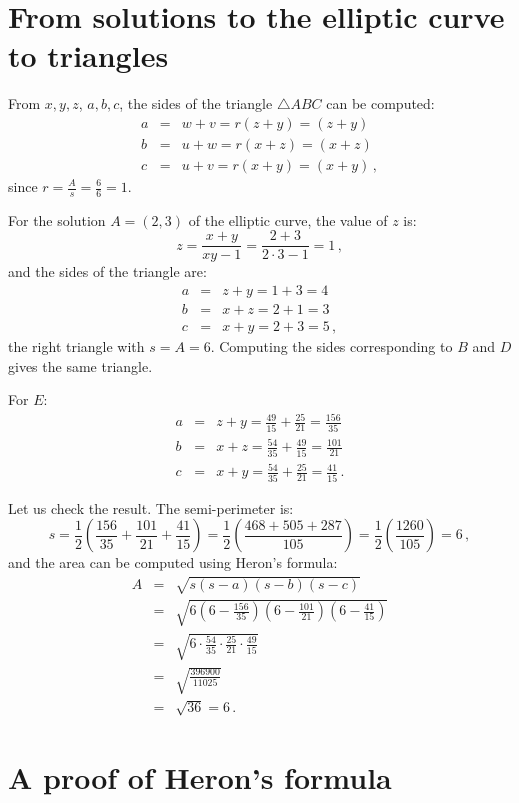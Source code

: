 \section{From solutions to the elliptic curve to triangles}

From $x,y,z$, $a,b,c$, the sides of the triangle $\triangle ABC$ can be computed:
\begin{eqnarray*}
a&=&w+v = r(z+y)=(z+y)\\
b&=&u+w= r(x+z)=(x+z)\\
c&=&u+v=r(x+y)=(x+y)\,,
\end{eqnarray*}
since $\displaystyle r=\frac{A}{s}=\frac{6}{6}=1$.

For the solution $A=(2,3)$ of the elliptic curve, the value of $z$ is:
\[
z=\frac{x+y}{xy-1}=\frac{2+3}{2\cdot 3-1}=1\,,
\]
and the sides of the triangle are:
\begin{eqnarray*}
a &=& z+y = 1+3 = 4\\
b &=& x+z = 2+1=3\\
c &=& x+y = 2+3=5\,,
\end{eqnarray*}
the right triangle with $s=A=6$. Computing the sides corresponding to $B$ and $D$ gives the same triangle.

For $E$:
\begin{eqnarray*}
a &=& z+y = \frac{49}{15} + \frac{25}{21} = \frac{156}{35}\\
b &=& x+z = \frac{54}{35} + \frac{49}{15} = \frac{101}{21}\\
c &=& x+y = \frac{54}{35} + \frac{25}{21}  = \frac{41}{15}\,.
\end{eqnarray*}

Let us check the result. The semi-perimeter is:
\[
s=\frac{1}{2}\left(\frac{156}{35} + \frac{101}{21}+\frac{41}{15}\right) = \frac{1}{2}\left(\frac{468+505+287}{105}\right) = \frac{1}{2}\left(\frac{1260}{105}\right)= 6\,,
\]
and the area can be computed using Heron's formula:
\begin{eqnarray*}
A &=& \sqrt{s(s-a)(s-b)(s-c)}\\
&=& \sqrt{6 \left(6-\frac{156}{35}\right) \left(6-\frac{101}{21}\right) \left(6-\frac{41}{15}\right)}\\
&=& \sqrt{6 \cdot \frac{54}{35}\cdot \frac{25}{21} \cdot \frac{49}{15}}\\
&=& \sqrt{\frac{396900}{11025}}\\
&=& \sqrt{36} = 6\,.
\end{eqnarray*}

\section{A proof of Heron's formula}

